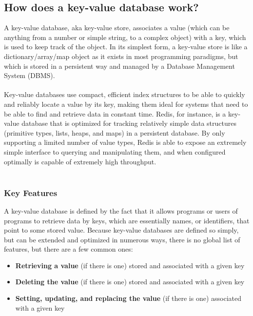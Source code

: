 \documentclass[10pt,a4paper]{article}
\newcommand{\nline}{\\~\\}
\begin{document}
\subsection{How does a key-value database work?}
A key-value database, aka key-value store, associates a value (which can be anything from a number or simple string, to a complex object) with a key, which is used to keep track of the object. In its simplest form, a key-value store is like a dictionary/array/map object as it exists in most programming paradigms, but which is stored in a persistent way and managed by a Database Management System (DBMS). \nline
Key-value databases use compact, efficient index structures to be able to quickly and reliably locate a value by its key, making them ideal for systems that need to be able to find and retrieve data in constant time. Redis, for instance, is a key-value database that is optimized for tracking relatively simple data structures (primitive types, lists, heaps, and maps) in a persistent database. By only supporting a limited number of value types, Redis is able to expose an extremely simple interface to querying and manipulating them, and when configured optimally is capable of extremely high throughput. \nline
\subsubsection{Key Features}
A key-value database is defined by the fact that it allows programs or users of programs to retrieve data by keys, which are essentially names, or identifiers, that point to some stored value. Because key-value databases are defined so simply, but can be extended and optimized in numerous ways, there is no global list of features, but there are a few common ones:
\begin{itemize}
	\item \textbf{Retrieving a value} (if there is one) stored and associated with a given key
	\item \textbf{Deleting the value} (if there is one) stored and associated with a given key
	\item \textbf{Setting, updating, and replacing the value} (if there is one) associated with a given key
\end{itemize}
\end{document}
